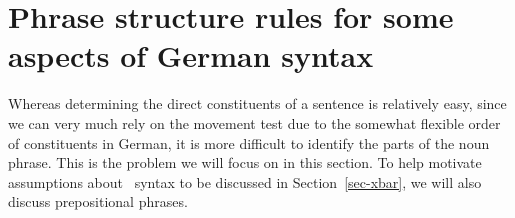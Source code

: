 


\section{Phrase structure rules for some aspects of German syntax}

Whereas determining the direct constituents of a sentence is relatively easy, since we can very much rely on the movement test due to the
somewhat flexible order of constituents in German, it is more difficult to identify the parts of the noun phrase. This is the problem
we will focus on in this section. To help motivate assumptions about \xbar~syntax to be discussed in Section~\ref{sec-xbar},
we will also discuss prepositional phrases.


